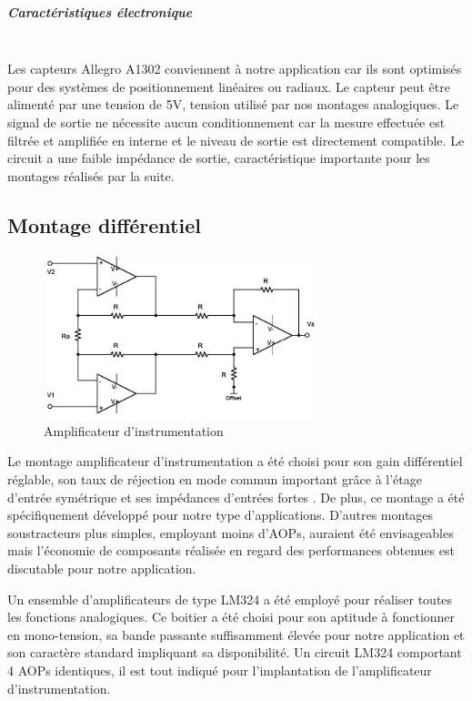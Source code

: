 \documentclass[11pt, french]{article} %
\begin{document}
\subparagraph*{Caractéristiques électronique}~\\
Les capteurs Allegro A1302 conviennent à notre application car ils sont optimisés pour des systèmes de positionnement linéaires ou radiaux. Le capteur peut être alimenté par une tension de 5V, tension utilisé par nos montages analogiques. Le signal de sortie ne nécessite aucun conditionnement car la mesure effectuée est filtrée et amplifiée en interne et le niveau de sortie est directement compatible. Le circuit a une faible impédance de sortie, caractéristique importante pour les montages réalisés par la suite.

\subsection{Montage différentiel}

\begin{figure}
  \includegraphics[width=8cm]{SolutionAnalogique/AmpInst}
  \caption{Amplificateur d'instrumentation}
\end{figure}
Le montage amplificateur d'instrumentation a été choisi pour son gain différentiel réglable, son taux de réjection en mode commun important grâce à l'étage d'entrée symétrique et ses impédances d'entrées fortes . De plus, ce montage a été spécifiquement développé pour notre type d'applications. D'autres montages soustracteurs plus simples, employant moins d'AOPs, auraient été envisageables mais l'économie de composants réalisée en regard des performances obtenues est discutable pour notre application. 

Un ensemble d'amplificateurs de type LM324 a été employé pour réaliser toutes les fonctions analogiques. Ce boitier a été choisi pour son aptitude à fonctionner en mono-tension, sa bande passante suffisamment élevée pour notre application et son caractère standard impliquant sa disponibilité. Un circuit LM324 comportant 4 AOPs identiques, il est tout indiqué pour l'implantation de l'amplificateur d'instrumentation.
\end{document}

